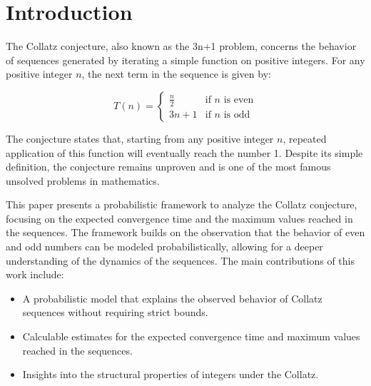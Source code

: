\section{Introduction}

The Collatz conjecture, also known as the 3n+1 problem, concerns the behavior of sequences generated by iterating a simple function on positive integers. For any positive integer \( n \), the next term in the sequence is given by:

\[
T(n) = 
\begin{cases} 
\frac{n}{2} & \text{if } n \text{ is even} \\ 
3n + 1 & \text{if } n \text{ is odd}
\end{cases}
\]

The conjecture states that, starting from any positive integer \( n \), repeated application of this function will eventually reach the number 1. Despite its simple definition, the conjecture remains unproven and is one of the most famous unsolved problems in mathematics.

This paper presents a probabilistic framework to analyze the Collatz conjecture, focusing on the expected convergence time and the maximum values reached in the sequences. The framework builds on the observation that the behavior of even and odd numbers can be modeled probabilistically, allowing for a deeper understanding of the dynamics of the sequences. The main contributions of this work include:
\begin{itemize}
    \item A probabilistic model that explains the observed behavior of Collatz sequences without requiring strict bounds.
    \item Calculable estimates for the expected convergence time and maximum values reached in the sequences.
    \item Insights into the structural properties of integers under the Collatz.
\end{itemize}
